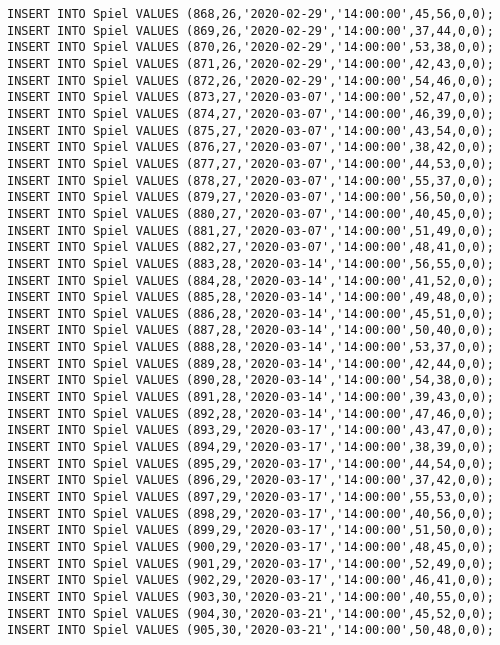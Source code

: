 \documentclass{bschlangaul-aufgabe}
\begin{document}
\begin{verbatim}
INSERT INTO Spiel VALUES (868,26,'2020-02-29','14:00:00',45,56,0,0);
INSERT INTO Spiel VALUES (869,26,'2020-02-29','14:00:00',37,44,0,0);
INSERT INTO Spiel VALUES (870,26,'2020-02-29','14:00:00',53,38,0,0);
INSERT INTO Spiel VALUES (871,26,'2020-02-29','14:00:00',42,43,0,0);
INSERT INTO Spiel VALUES (872,26,'2020-02-29','14:00:00',54,46,0,0);
INSERT INTO Spiel VALUES (873,27,'2020-03-07','14:00:00',52,47,0,0);
INSERT INTO Spiel VALUES (874,27,'2020-03-07','14:00:00',46,39,0,0);
INSERT INTO Spiel VALUES (875,27,'2020-03-07','14:00:00',43,54,0,0);
INSERT INTO Spiel VALUES (876,27,'2020-03-07','14:00:00',38,42,0,0);
INSERT INTO Spiel VALUES (877,27,'2020-03-07','14:00:00',44,53,0,0);
INSERT INTO Spiel VALUES (878,27,'2020-03-07','14:00:00',55,37,0,0);
INSERT INTO Spiel VALUES (879,27,'2020-03-07','14:00:00',56,50,0,0);
INSERT INTO Spiel VALUES (880,27,'2020-03-07','14:00:00',40,45,0,0);
INSERT INTO Spiel VALUES (881,27,'2020-03-07','14:00:00',51,49,0,0);
INSERT INTO Spiel VALUES (882,27,'2020-03-07','14:00:00',48,41,0,0);
INSERT INTO Spiel VALUES (883,28,'2020-03-14','14:00:00',56,55,0,0);
INSERT INTO Spiel VALUES (884,28,'2020-03-14','14:00:00',41,52,0,0);
INSERT INTO Spiel VALUES (885,28,'2020-03-14','14:00:00',49,48,0,0);
INSERT INTO Spiel VALUES (886,28,'2020-03-14','14:00:00',45,51,0,0);
INSERT INTO Spiel VALUES (887,28,'2020-03-14','14:00:00',50,40,0,0);
INSERT INTO Spiel VALUES (888,28,'2020-03-14','14:00:00',53,37,0,0);
INSERT INTO Spiel VALUES (889,28,'2020-03-14','14:00:00',42,44,0,0);
INSERT INTO Spiel VALUES (890,28,'2020-03-14','14:00:00',54,38,0,0);
INSERT INTO Spiel VALUES (891,28,'2020-03-14','14:00:00',39,43,0,0);
INSERT INTO Spiel VALUES (892,28,'2020-03-14','14:00:00',47,46,0,0);
INSERT INTO Spiel VALUES (893,29,'2020-03-17','14:00:00',43,47,0,0);
INSERT INTO Spiel VALUES (894,29,'2020-03-17','14:00:00',38,39,0,0);
INSERT INTO Spiel VALUES (895,29,'2020-03-17','14:00:00',44,54,0,0);
INSERT INTO Spiel VALUES (896,29,'2020-03-17','14:00:00',37,42,0,0);
INSERT INTO Spiel VALUES (897,29,'2020-03-17','14:00:00',55,53,0,0);
INSERT INTO Spiel VALUES (898,29,'2020-03-17','14:00:00',40,56,0,0);
INSERT INTO Spiel VALUES (899,29,'2020-03-17','14:00:00',51,50,0,0);
INSERT INTO Spiel VALUES (900,29,'2020-03-17','14:00:00',48,45,0,0);
INSERT INTO Spiel VALUES (901,29,'2020-03-17','14:00:00',52,49,0,0);
INSERT INTO Spiel VALUES (902,29,'2020-03-17','14:00:00',46,41,0,0);
INSERT INTO Spiel VALUES (903,30,'2020-03-21','14:00:00',40,55,0,0);
INSERT INTO Spiel VALUES (904,30,'2020-03-21','14:00:00',45,52,0,0);
INSERT INTO Spiel VALUES (905,30,'2020-03-21','14:00:00',50,48,0,0);

\end{verbatim}
\end{document}
